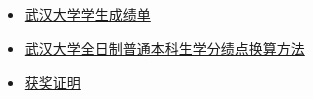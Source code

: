\documentclass[letterpaper,AutoFakeBold]{twentysecondcv} %
\begin{document}
\begin{CJK*}{UTF8}{gbsn}

\vspace{250pt}
\profilesection{}

\begin{CJK*}{UTF8}{gkai}
\section{}
\end{CJK*}

\begin{itemize}
	\setlength{\itemsep}{0pt}
	\setlength{\parsep}{0pt}
	\setlength{\parskip}{0pt}
	\item \href{https://github.com/RMSnow/CV/blob/master/XueyaoZhang_AT.pdf}{武汉大学学生成绩单}
	\item \href{https://github.com/RMSnow/CV/blob/master/XueyaoZhang_AT.pdf}{武汉大学全日制普通本科生学分绩点换算方法}
	\item \href{https://github.com/RMSnow/CV/blob/master/XueyaoZhang_Award.pdf}{获奖证明}
\end{itemize}








\end{CJK*}
\end{document}
